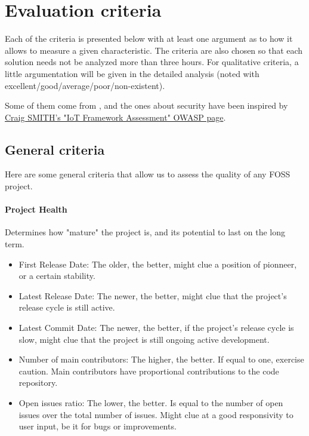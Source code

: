 \documentclass{article}
\begin{document}
\newpage

\section{Evaluation criteria}

Each of the criteria is presented below with at least one argument as to how it allows to measure a given characteristic. The criteria are also chosen so that each solution needs not be analyzed more than three hours. For qualitative criteria, a little argumentation will be given in the detailed analysis (noted with excellent/good/average/poor/non-existent).

Some of them come from \href{https://www.thingworx.com/wp-content/uploads/WP_oreilly-media_evaluating-and-choosing-an-iot-platform_978-1-491-95203-0_EN.pdf}{}, and the ones about security have been inspired by \href{https://www.owasp.org/index.php/IoT_Framework_Assessment}{Craig SMITH's "IoT Framework Assessment" OWASP page}.

\subsection{General criteria}

Here are some general criteria that allow us to assess the quality of any FOSS project.

\paragraph{Project Health} Determines how "mature" the project is, and its potential to last on the long term.

\begin{itemize}
\item First Release Date: The older, the better, might clue a position of pionneer, or a certain stability.
\item Latest Release Date: The newer, the better, might clue that the project's release cycle is still active.
\item Latest Commit Date: The newer, the better, if the project's release cycle is slow, might clue that the project is still ongoing active development.
\item Number of main contributors: The higher, the better. If equal to one, exercise caution. Main contributors have proportional contributions to the code repository.
\item Open issues ratio: The lower, the better. Is equal to the number of open issues over the total number of issues. Might clue at a good responsivity to user input, be it for bugs or improvements.
\end{itemize}
\end{document}
